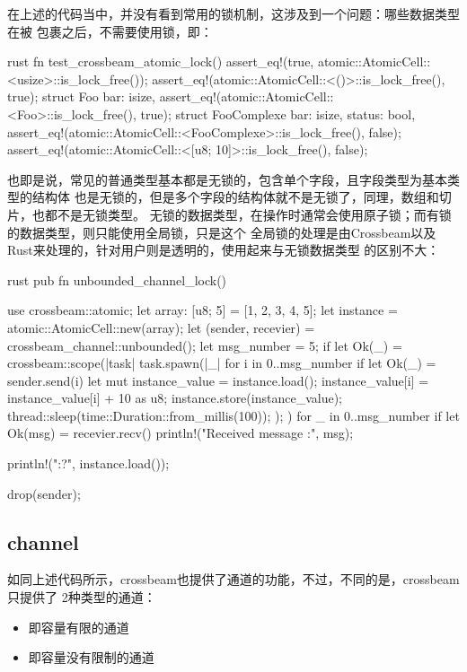 在上述的代码当中，并没有看到常用的锁机制，这涉及到一个问题：哪些数据类型在被
包裹之后，不需要使用锁，即：
\begin{code-block}{rust}
fn test_crossbeam_atomic_lock() {
    assert_eq!(true, atomic::AtomicCell::<usize>::is_lock_free());
    assert_eq!(atomic::AtomicCell::<()>::is_lock_free(), true);
    struct Foo {
        bar: isize,
    }
    assert_eq!(atomic::AtomicCell::<Foo>::is_lock_free(), true);
    struct FooComplexe {
        bar: isize,
        status: bool,
    }
    assert_eq!(atomic::AtomicCell::<FooComplexe>::is_lock_free(), false);
    assert_eq!(atomic::AtomicCell::<[u8; 10]>::is_lock_free(), false);
}
\end{code-block}
也即是说，常见的普通类型基本都是无锁的，包含单个字段，且字段类型为基本类型的结构体
也是无锁的，但是多个字段的结构体就不是无锁了，同理，数组和切片，也都不是无锁类型。
无锁的数据类型，在操作时通常会使用原子锁；而有锁的数据类型，则只能使用全局锁，只是这个
全局锁的处理是由Crossbeam以及Rust来处理的，针对用户则是透明的，使用起来与无锁数据类型
的区别不大：
\begin{code-block}{rust}
pub fn unbounded_channel_lock() {
    use crossbeam::atomic;
    let array: [u8; 5] = [1, 2, 3, 4, 5];
    let instance = atomic::AtomicCell::new(array);
    let (sender, recevier) = crossbeam_channel::unbounded();
    let msg_number = 5;
    if let Ok(_) = crossbeam::scope(|task| {
        task.spawn(|_| {
            for i in 0..msg_number {
                if let Ok(_) = sender.send(i) {
                    let mut instance_value = instance.load();
                    instance_value[i] = instance_value[i] + 10 as u8;
                    instance.store(instance_value);
                    thread::sleep(time::Duration::from_millis(100));
                }
            }
        });
    }) {
        for _ in 0..msg_number {
            if let Ok(msg) = recevier.recv() {
                println!("Received message :{}", msg);
            }
        }
    }

    println!("{:?}", instance.load());

    drop(sender);
}
\end{code-block}

\subsection{channel}
如同上述代码所示，crossbeam也提供了通道的功能，不过，不同的是，crossbeam只提供了
2种类型的通道：
\begin{itemize}
  \item {} 即容量有限的通道
  \item {} 即容量没有限制的通道
\end{itemize}

